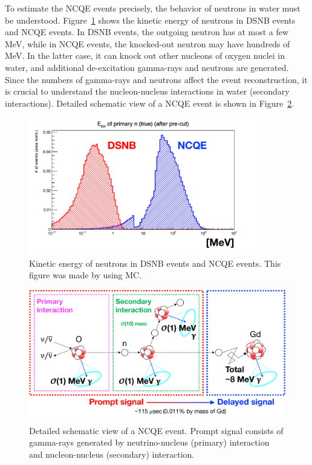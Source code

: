 \hs
To estimate the NCQE events precisely, the behavior of neutrons in water must be understood.
Figure~\ref{DSNB_NCQE_n} shows the kinetic energy of neutrons in DSNB events and NCQE events.
In DSNB events, the outgoing neutron has at most a few MeV, while in NCQE events, the knocked-out neutron may have hundreds of MeV.
In the latter case, it can knock out other nucleons of oxygen nuclei in water, and additional de-excitation gamma-rays and neutrons are generated.
Since the numbers of gamma-rays and neutrons affect the event reconstruction, it is crucial to understand the nucleon-nucleus interactions in water (secondary interactions).
Detailed schematic view of a NCQE event is shown in Figure~\ref{Introd_NCQE_PriSec}.

\begin{figure}[h]
	\centering
	\includegraphics[width=10cm]{Figures/Introduction/DSNB_NCQE_n}
	\caption[Kinetic energy of neutrons in DSNB events and NCQE events]{
	Kinetic energy of neutrons in DSNB events and NCQE events.
	This figure was made by using MC.
	}\label{DSNB_NCQE_n}
\end{figure}

\begin{figure}[h]
	\centering
	\includegraphics[width=12cm]{Figures/Introduction/NCQE_PriSec}
	\caption[Detailed schematic view of a NCQE event]{
	Detailed schematic view of a NCQE event.
	Prompt signal consists of gamma-rays generated by neutrino-nucleus (primary) interaction and nucleon-nucleus (secondary) interaction.
	}\label{Introd_NCQE_PriSec}
\end{figure}

